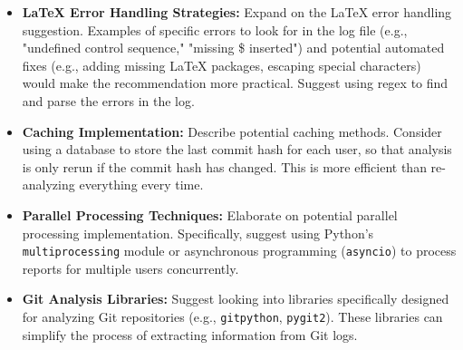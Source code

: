 \documentclass{article}
\begin{document}
\begin{itemize}
\begin{itemize}
\begin{itemize}
        \item \textbf{LaTeX Error Handling Strategies:}  Expand on the LaTeX error handling suggestion.  Examples of specific errors to look for in the log file (e.g., "undefined control sequence," "missing \$ inserted") and potential automated fixes (e.g., adding missing LaTeX packages, escaping special characters) would make the recommendation more practical.  Suggest using regex to find and parse the errors in the log.
        \item \textbf{Caching Implementation:} Describe potential caching methods. Consider using a database to store the last commit hash for each user, so that analysis is only rerun if the commit hash has changed. This is more efficient than re-analyzing everything every time.
       \item \textbf{Parallel Processing Techniques:} Elaborate on potential parallel processing implementation. Specifically, suggest using Python's \texttt{multiprocessing} module or asynchronous programming (\texttt{asyncio}) to process reports for multiple users concurrently.
        \item \textbf{Git Analysis Libraries:} Suggest looking into libraries specifically designed for analyzing Git repositories (e.g., \texttt{gitpython}, \texttt{pygit2}). These libraries can simplify the process of extracting information from Git logs.

    \end{itemize}


\end{itemize}
\end{itemize}
\end{document}
